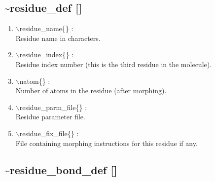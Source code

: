 \documentclass[12pt,titlepage]{article}
\begin{document}
\newpage
\subsection*{\bf \~{ }residue\_def []}

\begin{enumerate}

 \vspace{0.15in} 
 \item  $\backslash$residue\_name\{\} : \\ 
    Residue name in characters.

 \vspace{0.15in} 
 \item  $\backslash$residue\_index\{\} : \\ 
    Residue index number (this is the third residue in the molecule).

 \vspace{0.15in} 
 \item  $\backslash$natom\{\} : \\ 
    Number of atoms in the residue (after morphing).

 \vspace{0.15in} 
 \item  $\backslash$residue\_parm\_file\{\} : \\ 
    Residue parameter file.

 \vspace{0.15in} 
 \item  $\backslash$residue\_fix\_file\{\} : \\ 
    File containing morphing instructions for this residue if any.

\end{enumerate}

\newpage
\subsection*{\bf \~{ }residue\_bond\_def []}
\end{document}
